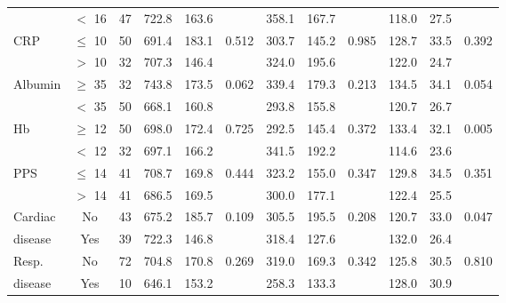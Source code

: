 \begin{sidewaystable}[p]
\begin{tabular}{l c c | c c c | c c c | c c c}
	           & $<$ 16    & 47 & 722.8 & 163.6 &          & 358.1 & 167.7 &          & 118.0 & 27.5 &  \\
	CRP        & $\leq$ 10 & 50 & 691.4 & 183.1 & 0.512    & 303.7 & 145.2 & 0.985    & 128.7 & 33.5 & 0.392    \\
	           & $>$ 10    & 32 & 707.3 & 146.4 &          & 324.0 & 195.6 &          & 122.0 & 24.7 &  \\
	Albumin    & $\geq$ 35 & 32 & 743.8 & 173.5 & 0.062    & 339.4 & 179.3 & 0.213    & 134.5 & 34.1 & 0.054    \\
	           & $<$ 35    & 50 & 668.1 & 160.8 &          & 293.8 & 155.8 &          & 120.7 & 26.7 &  \\
	Hb         & $\geq$ 12 & 50 & 698.0 & 172.4 & 0.725    & 292.5 & 145.4 & 0.372    & 133.4 & 32.1 & 0.005    \\
	           & $<$ 12    & 32 & 697.1 & 166.2 &          & 341.5 & 192.2 &          & 114.6 & 23.6 &  \\
	PPS        & $\leq$ 14 & 41 & 708.7 & 169.8 & 0.444    & 323.2 & 155.0 & 0.347    & 129.8 & 34.5 & 0.351    \\
	           & $>$ 14    & 41 & 686.5 & 169.5 &          & 300.0 & 177.1 &          & 122.4 & 25.5 &  \\
	Cardiac    & No        & 43 & 675.2 & 185.7 & 0.109    & 305.5 & 195.5 & 0.208    & 120.7 & 33.0 & 0.047    \\
	disease    & Yes       & 39 & 722.3 & 146.8 &          & 318.4 & 127.6 &          & 132.0 & 26.4 &  \\
	Resp.      & No        & 72 & 704.8 & 170.8 & 0.269    & 319.0 & 169.3 & 0.342    & 125.8 & 30.5 & 0.810    \\
	disease    & Yes       & 10 & 646.1 & 153.2 &          & 258.3 & 133.3 &          & 128.0 & 30.9 &
\end{tabular}
\end{sidewaystable}